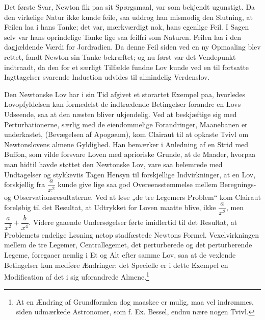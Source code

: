 \documentclass[12pt,a4paper]{book}
\begin{document}
Det første Svar, Newton fik paa sit Spørgsmaal, var som
bekjendt ugunstigt. Da den virkelige Natur ikke kunde feile, saa
uddrog han mismodig den Slutning, at Feilen laa i hans Tanke;
det var, mærkværdigt nok, hans egenlige Feil. I Sagen selv var
hans oprindelige Tanke lige saa feilfri som Naturen. Feilen laa
i den dagjældende Værdi for Jordradien. Da denne Feil siden
ved en ny Opmaaling blev rettet, fandt Newton sin Tanke
bekræftet; og nu først var det Vendepunkt indtraadt, da den for et
særligt Tilfælde fundne Lov kunde ved en til fortsatte
Iagttagelser svarende Induction udvides til almindelig Verdenslov.

Den Newtonske Lov har i sin Tid afgivet et storartet Exempel
paa, hvorledes Lovopfyldelsen kan formedelst de
indtrædende Betingelser forandre en Lovs Udseende, saa at den
næsten bliver ukjendelig. Ved at beskjæftige sig med
Perturbationerne, særlig med de eiendommelige Forandringer,
Maanebanen er underkastet, (Bevægelsen af Apogæum), kom Clairaut
til at opkaste Tvivl om Newtonslovens almene Gyldighed. Han
bemærker i Anledning af en Strid med Buffon, som vilde forsvare
Loven med aprioriske Grunde, at de Maader, hvorpaa man hidtil
havde støttet den Newtonske Lov, vare saa belemrede med
Undtagelser og stykkeviis Tagen Hensyn til forskjellige
Indvirkninger, at en Lov, forskjellig fra $\dfrac{a}{x^{2}}$ kunde give
lige saa god Overeensstemmelse mellem Beregnings- og
Observationsresultaterne. Ved at løse „de tre Legemers Problem“ kom
Clairaut foreløbig til det Resultat, at Udtrykket for Loven maatte
blive, ikke $\dfrac{a}{x^{2}}$, men $\dfrac{a}{x^{2}} + \dfrac{b}{x^{4}}$.
Videre gaaende Undersøgelser førte imidlertid til det Resultat,
at Problemets endelige Løsning netop stadfæstede Newtons Formel.
Vexelvirkningen mellem de tre Legemer, Centrallegemet, det
perturberede og det perturberende Legeme, foregaaer nemlig i Et
og Alt efter samme Lov, saa at de vexlende Betingelser kun
medføre Ændringer: det Specielle er i dette Exempel en
Modification af det i sig uforandrede Almene.\footnote{At en
Ændring af Grundformlen dog maaskee er mulig, maa vel
indrømmes, siden udmærkede Astronomer, som f. Ex. Bessel, endnu
nære nogen Tvivl.}
\end{document}
